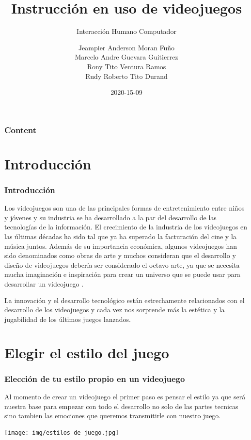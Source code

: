 \documentclass[11pt]{beamer}
\title[Examen - 01]{\bf\Huge Instrucción en uso de videojuegos}
\subtitle{Interacción Humano Computador}
\author[Grupo]
{
	Jeampier Anderson Moran Fuño \inst{1}\\
	Marcelo Andre Guevara Guitierrez\inst{1}\\
	Rony Tito Ventura Ramos\inst{1}\\
	Rudy Roberto Tito Durand\inst{1}
}
\institute[UNSA]
{
\inst{1}%
System Engineering School\\
System Engineering and Informatic Department\\
Production and Services Faculty\\
San Agustin National University of Arequipa
}
\date[2020-15-09]{\scriptsize{2020-15-09}}
\begin{document}
\begin{frame}
\titlepage
\end{frame}

\begin{frame}
\frametitle{Content}
\tableofcontents
\end{frame}

\section{Introducción}
\begin{frame}
\frametitle{Introducción}
Los videojuegos son una de las principales formas de entretenimiento entre niños y jóvenes y su industria se ha desarrollado a la par del desarrollo de las tecnologías de la información. El crecimiento de la industria de los videojuegos en las últimas décadas ha sido tal que ya ha superado la facturación del cine y la música juntos. Además de su importancia económica, algunos videojuegos han sido denominados como obras de arte y muchos consideran que el desarrollo y diseño de videojuegos debería ser considerado el octavo arte, ya que se necesita mucha imaginación e inspiración para crear un universo que se puede usar para desarrollar un videojuego .

La innovación y el desarrollo tecnológico están estrechamente relacionados con el desarrollo de los videojuegos y cada vez nos sorprende más la estética y la jugabilidad de los últimos juegos lanzados.

\end{frame}

\section{Elegir el estilo del juego}
\begin{frame}
\frametitle{Elección de tu estilo propio en un videojuego}
Al momento de crear un videojuego el primer paso es pensar el estilo ya que será nuestra base para empezar con todo el desarrollo no solo de las partes tecnicas sino tambien las emociones que queremos transmitirle con nuestro juego.
\begin{center}
 \texttt{[image: img/estilos de juego.jpg]}
\end{center}
\end{frame}
\end{document}
